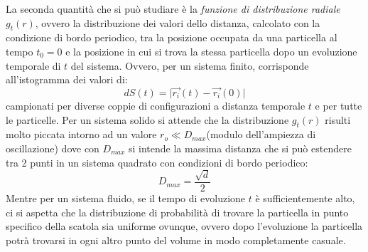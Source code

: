 \documentclass[11pt]{article}
\theoremstyle{plain}
\theoremstyle{remark}
\begin{document}
\begin{itemize}
La seconda quantità che si può studiare è la \emph{funzione di distribuzione radiale} $g_t(r)$, ovvero la distribuzione dei valori dello distanza, calcolato con la condizione di bordo periodico, tra la posizione occupata da una particella al tempo $t_0=0$ e la posizione in cui si trova la stessa particella dopo un evoluzione temporale di $t$ del sistema. Ovvero, per un sistema finito, corrisponde all'istogramma dei valori di:
\begin{equation}
dS(t) = \big\vert \vec{r_i}(t) - \vec{r_i}(0) \big\vert
\end{equation}
campionati per diverse coppie di configurazioni a distanza temporale $t$ e per tutte le particelle.
\newline
Per un sistema solido si attende che la distribuzione $g_t(r)$ risulti molto piccata intorno ad un valore $r_o\ll D_{max}$(modulo dell'ampiezza di oscillazione) dove con $D_{max}$ si intende la massima distanza che si può estendere tra 2 punti in un sistema quadrato con condizioni di bordo periodico:
\begin{equation}
D_{max}= \frac{\sqrt{d}}{2}
\end{equation}
Mentre per un sistema fluido, se il tempo di evoluzione $t$ è sufficientemente alto, ci si aspetta che la distribuzione di probabilità di trovare la particella in punto specifico della scatola sia uniforme ovunque, ovvero dopo l'evoluzione la particella potrà trovarsi in ogni altro punto del volume in modo completamente casuale.


\end{itemize}
\end{document}
